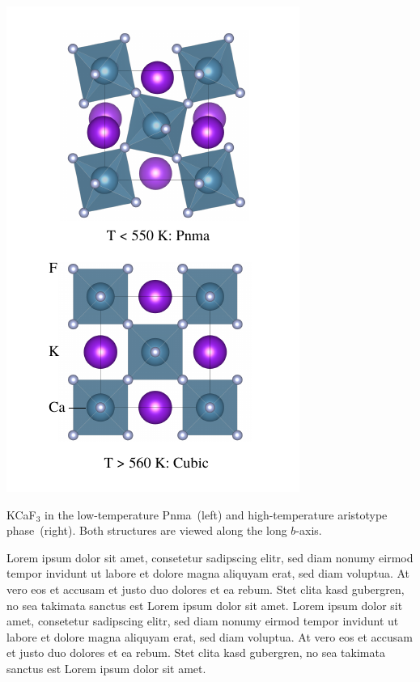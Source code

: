 \begin{marginfigure}
	\includegraphics[width=\textwidth]{./data/plots/anharmonicity/2_materials/both.pdf}
	\caption{
		\label{fig:KCaF3}
		KCaF$_3$ in the low-temperature Pnma~(left) and high-temperature aristotype phase~(right). Both structures are viewed along the long $b$-axis.
	}
\end{marginfigure}

Lorem ipsum dolor sit amet, consetetur sadipscing elitr, sed diam nonumy eirmod tempor invidunt ut labore et dolore magna aliquyam erat, sed diam voluptua. At vero eos et accusam et justo duo dolores et ea rebum. Stet clita kasd gubergren, no sea takimata sanctus est Lorem ipsum dolor sit amet. Lorem ipsum dolor sit amet, consetetur sadipscing elitr, sed diam nonumy eirmod tempor invidunt ut labore et dolore magna aliquyam erat, sed diam voluptua. At vero eos et accusam et justo duo dolores et ea rebum. Stet clita kasd gubergren, no sea takimata sanctus est Lorem ipsum dolor sit amet.

